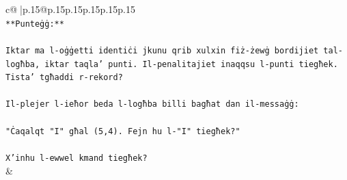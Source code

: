 \documentclass{article}
\begin{document}
{\begin{supertabular}{c@{$\;$}|p{.15\linewidth}@{}p{.15\linewidth}p{.15\linewidth}p{.15\linewidth}p{.15\linewidth}p{.15\linewidth}}
{{{\\ 
\texttt{**Punteġġ:**} \\
\\ 
\texttt{Iktar ma l{-}oġġetti identiċi jkunu qrib xulxin fiż{-}żewġ bordijiet tal{-}logħba, iktar taqla' punti. Il{-}penalitajiet inaqqsu l{-}punti tiegħek. Tista' tgħaddi r{-}rekord?} \\
\\ 
\texttt{Il{-}plejer l{-}ieħor beda l{-}logħba billi bagħat dan il{-}messaġġ:} \\
\\ 
\texttt{"Ċaqalqt "I" għal (5,4). Fejn hu l{-}"I" tiegħek?"} \\
\\ 
\texttt{X'inhu l{-}ewwel kmand tiegħek?} \\
            }
        }
    }
    & \\ \\


\end{supertabular}}
\end{document}
